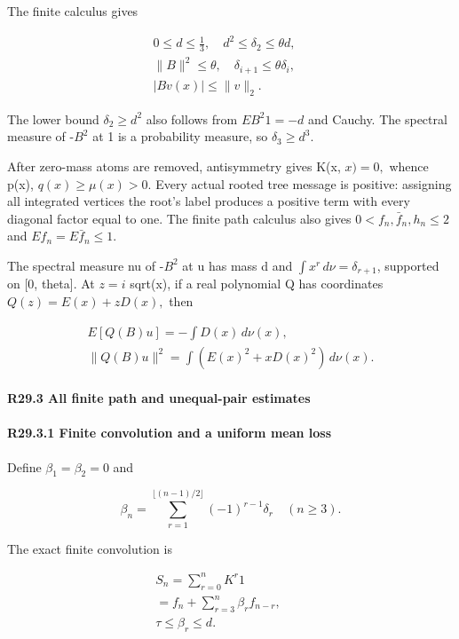 The finite calculus gives

\[
\begin{gathered}
0\le d\le\frac13,\quad d^2\le \delta_2\le\theta d,\quad\\
\|B\|^2\le\theta,\quad \delta_{i+1}\le\theta \delta_i,\quad\\
|Bv(x)|\le\|v\|_2.
\end{gathered}\tag{R29.2.2}
\]

The lower bound \(\delta_2\ge d^2\) also follows from \(EB^2 1=-d\) and Cauchy.
The spectral measure of -\(B^2\) at 1 is a probability measure, so
\(\delta_3\ge d^3.\) 

After zero-mass atoms are removed, antisymmetry gives K(x, \(x)=0,\allowbreak \) whence
p(x), \(q(x)\ge \mu(x)>0.\) Every actual rooted tree message is positive:
assigning all integrated vertices the root's label produces a positive
term with every diagonal factor equal to one. The finite path calculus
also gives \(0<f_n,\allowbreak  \bar f_n,\allowbreak  h_n\le 2\) and \(Ef_n=E\bar f_n\le 1.\)

The spectral measure nu of -\(B^2\) at u has mass d and
\(\int x^r\,\allowbreak \allowbreak  d\nu=\delta_{r+1}\), supported on [0, theta]. At \(z=i\) sqrt(x),
if a real polynomial Q has coordinates \(Q(z)=E(x)+zD(x),\allowbreak \) then

\[
\begin{gathered}
E[Q(B)u]=-\int D(x)\,d\nu(x),\qquad\\
\|Q(B)u\|^2=\int(E(x)^2+xD(x)^2)\,d\nu(x).
\end{gathered}\tag{R29.2.3}
\]


\paragraph{R29.3 All finite path and unequal-pair estimates}

\paragraph{R29.3.1 Finite convolution and a uniform mean loss}\label{part:R29.3.1}

Define \(\beta_1=\beta_2=0\) and

\[
\beta_n=\sum_{r=1}^{\lfloor(n-1)/2\rfloor}(-1)^{r-1}\delta_r
\quad(n\ge3).
\]

The exact finite convolution is

\[
\begin{gathered}
S_n=\sum_{r=0}^nK^r1\\
=f_n+\sum_{r=3}^n\beta_r f_{n-r},\qquad\\
\tau\le\beta_r\le d.
\end{gathered}\tag{R29.3.1}
\]

